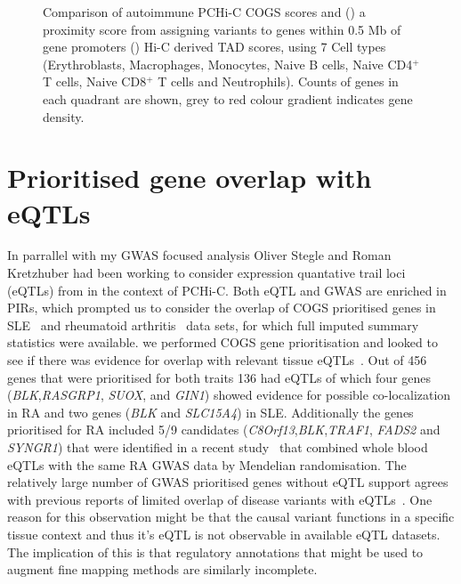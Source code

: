\documentclass[a4paper,11pt]{report}
\begin{document}
\begin{figure}[h]
\begin{subfigure}{0.7\textwidth}
		\caption{}\label{fig:fig_b}
	\end{subfigure}
\begin{minipage}[t]{0.7\textwidth}
	\caption{Comparison of autoimmune PCHi-C COGS scores and () a proximity score from assigning variants to genes within 0.5 Mb of gene promoters () Hi-C derived TAD scores, using 7 Cell types (Erythroblasts, Macrophages, Monocytes, Naive B cells, Naive CD4$^{+}$ T cells, Naive CD8$^{+}$ T cells and Neutrophils). Counts of genes in each quadrant are shown, grey to red colour gradient indicates gene density.}
\end{minipage}
\label{fig:cog_prox_comparison}
\end{figure}

\section{Prioritised gene overlap with eQTLs}
In parrallel with my GWAS focused analysis Oliver Stegle and Roman Kretzhuber had been working to consider expression quantative trail loci (eQTLs) from \citet{FairfaxMakinoRadhakrishnanEtAl2012} in the context of PCHi-C. Both eQTL and GWAS are enriched in PIRs, which prompted us to consider the overlap of COGS prioritised genes in SLE~\citep{Bentham2015-di} and rheumatoid arthritis~\citep{Okada2014-um} data sets, for which full imputed summary statistics were available. we performed COGS gene prioritisation and looked to see if there was evidence for overlap with relevant tissue eQTLs~\citep{FairfaxMakinoRadhakrishnanEtAl2012}.  Out of 456 genes that were prioritised for both traits 136 had eQTLs  of which four genes (\textit{BLK},\textit{RASGRP1}, \textit{SUOX}, and \textit{GIN1}) showed evidence for possible co-localization in RA and two genes (\textit{BLK} and \textit{SLC15A4}) in SLE. Additionally the genes prioritised for RA included 5/9 candidates (\textit{C8Orf13},\textit{BLK},\textit{TRAF1}, \textit{FADS2} and \textit{SYNGR1}) that were identified in a recent study~\citep{ZhuZhangHuEtAl2016} that combined whole blood eQTLs with the same RA GWAS data by Mendelian randomisation. The relatively large number of GWAS prioritised genes without eQTL support  agrees with previous reports of limited overlap of disease variants with eQTLs~\citep{Guo2015-ka,HuangChenEsparzaEtAl2015}. One reason for this observation might be that the causal variant functions in a specific tissue context and thus it's eQTL is not observable in available eQTL datasets. The implication of this is that regulatory annotations that might be used to augment fine mapping methods are similarly incomplete. 
\end{document}
